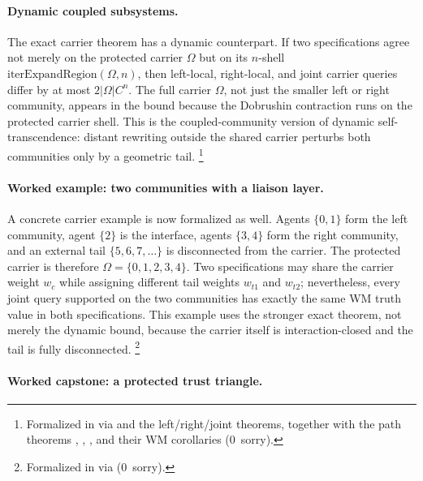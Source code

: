 \documentclass[11pt,openany]{report}
\begin{document}
\paragraph{Dynamic coupled subsystems.}

The exact carrier theorem has a dynamic counterpart.  If two specifications
agree not merely on the protected carrier $\Omega$ but on its $n$-shell
\(\mathrm{iterExpandRegion}(\Omega,n)\), then left-local, right-local, and
joint carrier queries differ by at most \(2|\Omega|C^n\).  The full carrier
\(\Omega\), not just the smaller left or right community, appears in the
bound because the Dobrushin contraction runs on the protected carrier shell.
This is the
coupled-community version of dynamic self-transcendence: distant rewriting
outside the shared carrier perturbs both communities only by a geometric
tail.%
\footnote{Formalized in
via  and the left/right/joint
 theorems, together with the path
theorems ,
,
, and their WM corollaries
(0~sorry).}

\paragraph{Worked example: two communities with a liaison layer.}

A concrete carrier example is now formalized as well.  Agents
\(\{0,1\}\) form the left community, agent \(\{2\}\) is the interface,
agents \(\{3,4\}\) form the right community, and an external tail
\(\{5,6,7,\ldots\}\) is disconnected from the carrier.  The protected
carrier is therefore \(\Omega = \{0,1,2,3,4\}\).  Two specifications may
share the carrier weight \(w_c\) while assigning different tail weights
\(w_{t1}\) and \(w_{t2}\); nevertheless, every joint query supported on the
two communities has exactly the same WM truth value in both specifications.
This example uses the stronger exact theorem, not merely the dynamic bound,
because the carrier itself is interaction-closed and the tail is fully
disconnected.%
\footnote{Formalized in
via  (0~sorry).}

\paragraph{Worked capstone: a protected trust triangle.}
\end{document}
